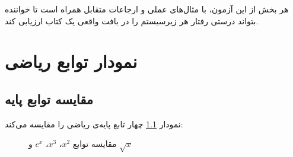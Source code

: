 \documentclass{matinbook}
\begin{document}
هر بخش از این آزمون، با مثال‌های عملی و ارجاعات متقابل
همراه است تا خواننده بتواند درستی رفتار هر زیرسیستم را
در بافت واقعی یک کتاب ارزیابی کند.

\clearpage

\tableofcontents
\clearpage

\listoffigures
\clearpage

\listoftables
\clearpage

\mainmatter
\mainmattergeometry

\chapter{نمودار توابع ریاضی}
\label{chap:function-plots}

\section{مقایسه توابع پایه}
\label{sec:plots-basic}

نمودار \cref{fig:basic-functions} چهار تابع پایه‌ی ریاضی
را مقایسه می‌کند:

\begin{figure}[h]
\centering
\begin{latin}
\end{latin}
\caption{مقایسه توابع $x^{2}$، $x^{3}$، $e^{x}$ و $\sqrt{x}$}
\label{fig:basic-functions}
\end{figure}
\end{document}
